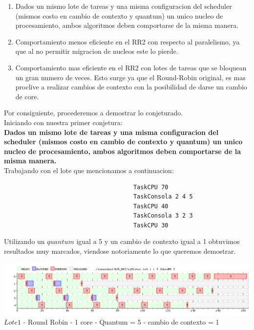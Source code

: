 \begin{enumerate}
 \item Dados un mismo lote de tareas y una misma configuracion del scheduler (mismos costo en cambio
de contexto y quantum) un unico nucleo de procesamiento, ambos algoritmos deben comportarse
de la misma manera.
\item Comportamiento menos eficiente en el RR2 con respecto al paralelismo, ya que al no permitir
migracion de nucleos este lo pierde.
\item Comportamiento mas eficiente en el RR2 con lotes de tareas que se bloquean un gran numero
de veces. Esto surge ya que el Round-Robin original, es mas proclive a realizar cambios de contexto con la posibilidad
de darse un cambio de core.
\end{enumerate}

Por consiguiente, procederemos a demostrar lo conjeturado.\\

Iniciando con nuestra primer conjetura:\\

\textbf{Dados un mismo lote de tareas y una misma configuracion del scheduler 
 (mismos costo en cambio de contexto y quantum)
un unico nucleo de procesamiento, ambos algoritmos deben comportarse
de la misma manera.}\\

Trabajando con el lote que mencionamos a continuacion:
    
    \begin{verbatim}
                                     TaskCPU 70
                                     TaskConsola 2 4 5
                                     TaskCPU 40
                                     TaskConsola 3 2 3
                                     TaskCPU 30
    \end{verbatim}

Utilizando un $quantum$ igual a 5 y un cambio de contexto igual a 1 obtuvimos 
resultados muy marcados, viendose notoriamente lo que queremos demostrar.\\

\begin{center}
    	\includegraphics[width=450pt]{./EJ8_RR2/dif1corerr.png}
	{$Lote 1$ - Round Robin - 1 core - Quantum = 5 - cambio de contexto = 1}	
 \end{center}
 
